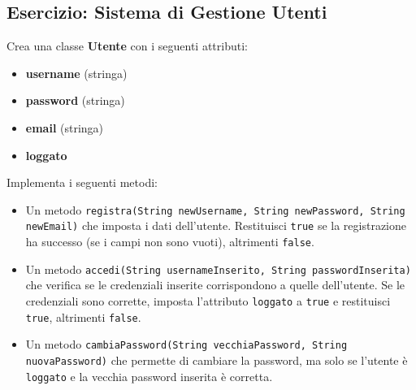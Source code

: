 \documentclass{article}
\begin{document}
\subsection*{Esercizio: Sistema di Gestione Utenti}
Crea una classe \textbf{Utente} con i seguenti attributi:
\begin{itemize}
    \item \textbf{username} (stringa)
    \item \textbf{password} (stringa)
    \item \textbf{email} (stringa)
    \item \textbf{loggato}
\end{itemize}
Implementa i seguenti metodi:
\begin{itemize}
    \item Un metodo \texttt{registra(String newUsername, String newPassword, String newEmail)} che imposta i dati dell'utente. Restituisci \texttt{true} se la registrazione ha successo (se i campi non sono vuoti), altrimenti \texttt{false}.
    \item Un metodo \texttt{accedi(String usernameInserito, String passwordInserita)} che verifica se le credenziali inserite corrispondono a quelle dell'utente. Se le credenziali sono corrette, imposta l'attributo \texttt{loggato} a \texttt{true} e restituisci \texttt{true}, altrimenti \texttt{false}.
    \item Un metodo \texttt{cambiaPassword(String vecchiaPassword, String nuovaPassword)} che permette di cambiare la password, ma solo se l'utente è \texttt{loggato} e la vecchia password inserita è corretta.
\end{itemize}
\end{document}
